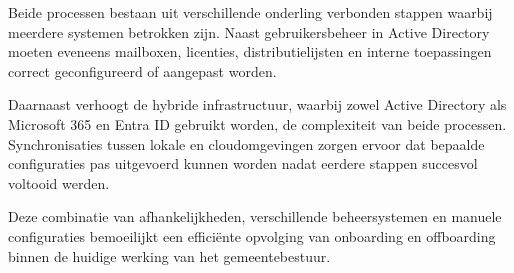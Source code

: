 Beide processen bestaan uit verschillende onderling verbonden stappen waarbij meerdere systemen betrokken zijn. Naast gebruikersbeheer in Active Directory moeten eveneens mailboxen, licenties, distributielijsten en interne toepassingen correct geconfigureerd of aangepast worden.

Daarnaast verhoogt de hybride infrastructuur, waarbij zowel Active Directory als Microsoft 365 en Entra ID gebruikt worden, de complexiteit van beide processen. Synchronisaties tussen lokale en cloudomgevingen zorgen ervoor dat bepaalde configuraties pas uitgevoerd kunnen worden nadat eerdere stappen succesvol voltooid werden.

Deze combinatie van afhankelijkheden, verschillende beheersystemen en manuele configuraties bemoeilijkt een efficiënte opvolging van onboarding en offboarding binnen de huidige werking van het gemeentebestuur.
